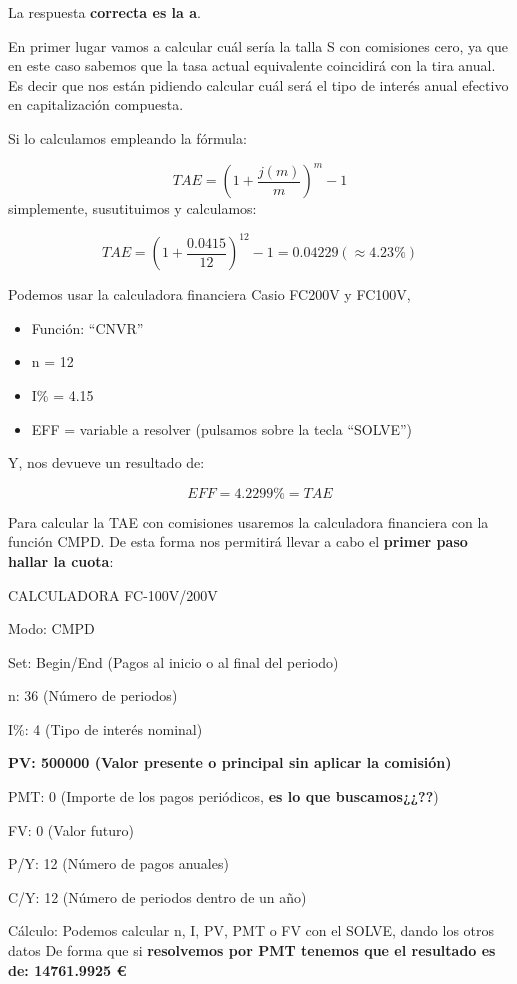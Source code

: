 \documentclass[
  letterpaper,
  DIV=11,
  numbers=noendperiod]{scrreprt}
\begin{document}
\begin{tcolorbox}
\begin{tcolorbox}
La respuesta \textbf{correcta es la a}.

En primer lugar vamos a calcular cuál sería la talla S con comisiones
cero, ya que en este caso sabemos que la tasa actual equivalente
coincidirá con la tira anual. Es decir que nos están pidiendo calcular
cuál será el tipo de interés anual efectivo en capitalización compuesta.

Si lo calculamos empleando la fórmula:

\[TAE=\left(1+\frac{j\left(m\right)}{m}\right)^m-1\] simplemente,
susutituimos y calculamos:

\[TAE=\left(1+\frac{0.0415}{12}\right)^{12}-1=0.04229\left(\approx 4.23\%\right)\]

Podemos usar la calculadora financiera Casio FC200V y FC100V,

\begin{itemize}
\item
  Función: ``CNVR''
\item
  n = 12
\item
  I\% = 4.15
\item
  EFF = variable a resolver (pulsamos sobre la tecla ``SOLVE'')
\end{itemize}

Y, nos devueve un resultado de:

\[EFF = 4.2299\% = TAE\]

Para calcular la TAE con comisiones usaremos la calculadora financiera
con la función CMPD. De esta forma nos permitirá llevar a cabo el
\textbf{primer paso hallar la cuota}:

CALCULADORA FC-100V/200V

Modo: CMPD

Set: Begin/End (Pagos al inicio o al final del periodo)

n: 36 (Número de periodos)

I\%: 4 (Tipo de interés nominal)

\textbf{PV: 500000 (Valor presente o principal sin aplicar la comisión)}

PMT: 0 (Importe de los pagos periódicos, \textbf{es lo que
buscamos¿¿??})

FV: 0 (Valor futuro)

P/Y: 12 (Número de pagos anuales)

C/Y: 12 (Número de periodos dentro de un año)

Cálculo: Podemos calcular n, I, PV, PMT o FV con el SOLVE, dando los
otros datos De forma que si \textbf{resolvemos por PMT tenemos que el
resultado es de: 14761.9925 €}


\end{tcolorbox}
\end{tcolorbox}
\end{document}
